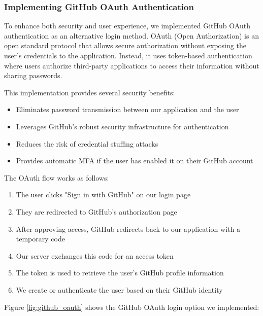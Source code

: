 \documentclass{article}
\begin{document}
\subsubsection{Implementing GitHub OAuth Authentication}
To enhance both security and user experience, we implemented GitHub OAuth authentication as an alternative login method. OAuth (Open Authorization) is an open standard protocol that allows secure authorization without exposing the user's credentials to the application. Instead, it uses token-based authentication where users authorize third-party applications to access their information without sharing passwords.

This implementation provides several security benefits:
\begin{itemize}
    \item Eliminates password transmission between our application and the user
    \item Leverages GitHub's robust security infrastructure for authentication
    \item Reduces the risk of credential stuffing attacks
    \item Provides automatic MFA if the user has enabled it on their GitHub account
\end{itemize}

The OAuth flow works as follows:
\begin{enumerate}
    \item The user clicks "Sign in with GitHub" on our login page
    \item They are redirected to GitHub's authorization page
    \item After approving access, GitHub redirects back to our application with a temporary code
    \item Our server exchanges this code for an access token
    \item The token is used to retrieve the user's GitHub profile information
    \item We create or authenticate the user based on their GitHub identity
\end{enumerate}

Figure \ref{fig:github_oauth} shows the GitHub OAuth login option we implemented:
\end{document}
